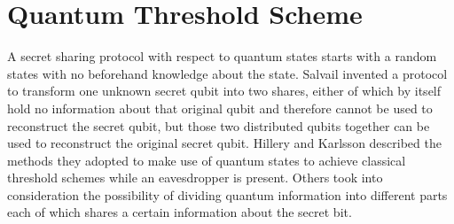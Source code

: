 \documentclass[12pt]{article}
\begin{document}
\section{Quantum Threshold Scheme}
    A secret sharing protocol with respect to quantum states starts with a random states with no beforehand knowledge about the state. 
	Salvail\cite{Salvail} invented a protocol to transform one unknown secret qubit into two shares, either of which by itself hold no information about that original qubit and therefore cannot be used to reconstruct the secret qubit, 
	but those two distributed qubits together can be used to reconstruct the original secret qubit.
	Hillery\cite{Hillery} and Karlsson\cite{Karlsson} described the methods they adopted to make use of quantum states to achieve classical threshold schemes while an eavesdropper is present. Others took into consideration the possibility of dividing quantum information into different parts each of which shares a certain information about the secret bit.
\end{document}
